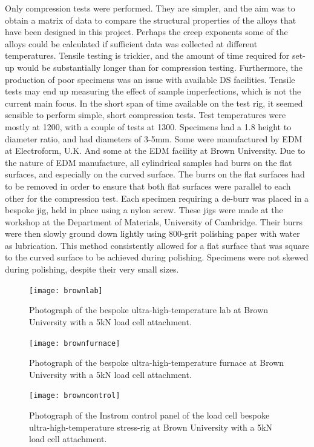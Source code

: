 Only compression tests were performed.  They are simpler, and the aim was to obtain a matrix of data to compare the structural properties of the alloys that have been designed in this project.  Perhaps the creep exponents some of the alloys could be calculated if sufficient data was collected at different temperatures.  Tensile testing is trickier, and the amount of time required for set-up would be substantially longer than for compression testing. Furthermore, the production of poor specimens was an issue with available DS facilities.  Tensile tests may end up measuring the effect of sample imperfections, which is not the current main focus.  In the short span of time available on the test rig, it seemed sensible to perform simple, short compression tests.  Test temperatures were mostly at 1200\celsius, with a couple of tests at 1300\celsius.  Specimens had a 1.8 height to diameter ratio, and had diameters of 3-5mm.  Some were manufactured by EDM at Electroform, U.K.  And some at the EDM facility at Brown University.  Due to the nature of EDM manufacture, all cylindrical samples had burrs on the flat surfaces, and especially on the curved surface.  The burrs on the flat surfaces had to be removed in order to ensure that both flat surfaces were parallel to each other for the compression test. Each specimen requiring a de-burr was placed in a bespoke jig, held in place using a nylon screw.  These jigs were made at the workshop at the Department of Materials, University of Cambridge.  Their burrs were then slowly ground down lightly using 800-grit polishing paper with water as lubrication.  This method consistently allowed for a flat surface that was square to the curved surface to be achieved during polishing.  Specimens were not skewed during polishing, despite their very small sizes.

%
\begin{figure}[H]
\begin{center}
\texttt{[image: brownlab]}
\caption{Photograph of the bespoke ultra-high-temperature lab at Brown University with a 5kN load cell attachment.}\label{fig:brownlab}
\end{center}
\end{figure}  
%
%
\begin{figure}[H]
\begin{center}
\texttt{[image: brownfurnace]}
\caption{Photograph of the bespoke ultra-high-temperature furnace at Brown University with a 5kN load cell attachment.}\label{fig:brownfurnace}
\end{center}
\end{figure}  
%
%
\begin{figure}[H]
\begin{center}
\texttt{[image: browncontrol]}
\caption{Photograph of the Instrom control panel of the load cell bespoke ultra-high-temperature stress-rig at Brown University with a 5kN load cell attachment.}\label{fig:browncontrol}
\end{center}
\end{figure}  
%




